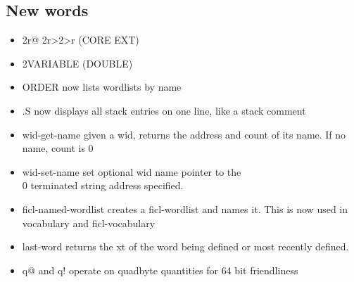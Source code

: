\subsection*{New words}
\begin{itemize}[noitemsep]
	\item 2r@ 2r\textgreater 2\textgreater r (CORE EXT)

	\item 2VARIABLE (DOUBLE)

	\item ORDER now lists wordlists by name

	\item .S now displays all stack entries on one line, like a
	stack comment

	\item wid-get-name   given a wid, returns the address and count
	of its name. If no name, count is 0

	\item wid-set-name  set optional wid name pointer to the \\0
	terminated string address specified.

	\item ficl-named-wordlist creates a ficl-wordlist and names it.
	This is now used in vocabulary and ficl-vocabulary

	\item last-word  returns the xt of the word being defined or
	most recently defined.

	\item q@ and q! operate on quadbyte quantities for 64 bit
	friendliness
\end{itemize}


